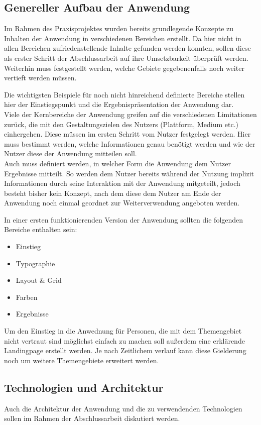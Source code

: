 \subsection{Genereller Aufbau der Anwendung}
\label{chapter:setting}
Im Rahmen des Praxisprojektes wurden bereits grundlegende Konzepte zu Inhalten der Anwendung in verschiedenen Bereichen erstellt. Da hier nicht in allen Bereichen zufriedenstellende Inhalte gefunden werden konnten, sollen diese als erster Schritt der Abschlussarbeit auf ihre Umsetzbarkeit überprüft werden. Weiterhin muss festgestellt werden, welche Gebiete gegebenenfalls noch weiter vertieft werden müssen.

Die wichtigsten Beispiele für noch nicht hinreichend definierte Bereiche stellen hier der Einstiegspunkt und die Ergebnispräsentation der Anwendung dar.\\
Viele der Kernbereiche der Anwendung greifen auf die verschiedenen Limitationen zurück, die mit den Gestaltungszielen des Nutzers (Plattform, Medium etc.) einhergehen. Diese müssen im ersten Schritt vom Nutzer festgelegt werden. Hier muss bestimmt werden, welche Informationen genau benötigt werden und wie der Nutzer diese der Anwendung mitteilen soll.\\
Auch muss definiert werden, in welcher Form die Anwendung dem Nutzer Ergebnisse mitteilt. So werden dem Nutzer bereits während der Nutzung implizit Informationen durch seine Interaktion mit der Anwendung mitgeteilt, jedoch besteht bisher kein Konzept, nach dem diese dem Nutzer am Ende der Anwendung noch einmal geordnet zur Weiterverwendung angeboten werden.

In einer ersten funktionierenden Version der Anwendung sollten die folgenden Bereiche enthalten sein:

\begin{itemize}
  \item Einstieg
  \item Typographie
  \item Layout \& Grid
  \item Farben
  \item Ergebnisse
\end{itemize}

Um den Einstieg in die Anwednung für Personen, die mit dem Themengebiet nicht vertraut sind möglichst einfach zu machen soll außerdem eine erklärende Landingpage erstellt werden. Je nach Zeitlichem verlauf kann diese Gielderung noch um weitere Themengebiete erweitert werden.

\subsection{Technologien und Architektur}
Auch die Architektur der Anwendung und die zu verwendenden Technologien sollen im Rahmen der Abschlussarbeit diskutiert werden.

